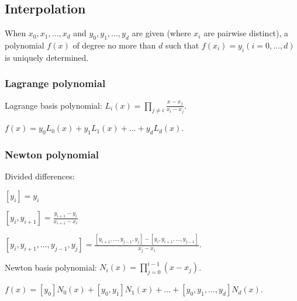 \subsection{Interpolation}

When $x_0, x_1, \dots, x_d$ and $y_0, y_1, \dots, y_d$
are given (where $x_i$ are pairwise distinct), a polynomial
$f(x)$ of degree no more than $d$ such that $f(x_i) = y_i (i = 0, \dots, d)$
is uniquely determined.

\subsubsection{Lagrange polynomial}

Lagrange basis polynomial: $L_i(x) = \prod_{j \ne i} \frac{x - x_j}{x_i - x_j}$.
	
$f(x) = y_0 L_0(x) + y_1 L_1(x) + \dots + y_d L_d(x)$.

\subsubsection{Newton polynomial}

Divided differences:

$[y_i] = y_i$

$[y_i, y_{i + 1}] = \frac{y_{i + 1} - y_i}{x_{i + 1} - x_i}$

$[y_i, y_{i + 1}, \dots, y_{j - 1}, y_j] = \frac{[y_{i + 1}, \dots, y_{j - 1}, y_j] - [y_i, y_{i + 1}, \dots, y_{j - 1}]}{x_j - x_i}$.

Newton basis polynomial: $N_i(x) = \prod_{j=0}^{i-1} (x - x_j)$.

$f(x) = [y_0] N_0(x) + [y_0, y_1] N_1 (x) + \dots + [y_0, y_1, \dots, y_d] N_d(x)$.
